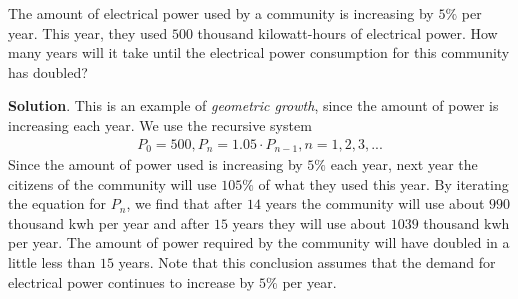 \documentclass[10pt,]{book}
\theoremstyle{ptxdefinitionnotitle}
\theoremstyle{ptxdefinitiontitle}
\theoremstyle{ptxdefinitionnotitle}
\theoremstyle{ptxdefinitiontitle}
\theoremstyle{ptxdefinitionnotitle}
\theoremstyle{ptxdefinitiontitle}
\numberwithin{equation}{section}
\begin{document}
\begin{example}\label{example-electrical-power-demand}
\hypertarget{p-73}{}%
The amount of electrical power used by a community is increasing by \(5\%\) per year.  This year, they used \(500\) thousand kilowatt-hours of electrical power.  How many years will it take until the electrical power consumption for this community has doubled?%
\par\smallskip%
\noindent\textbf{Solution}.\hypertarget{solution-5}{}\quad%
\hypertarget{p-74}{}%
This is an example of \emph{geometric growth}, since the amount of power is increasing each year. We use the recursive system%
%
\begin{gather*}
P_0=500, P_n=1.05 \cdot P_{n-1}, n=1,2,3,...
\end{gather*}
\hypertarget{p-75}{}%
Since the amount of power used is increasing by \(5\%\) each year, next year the citizens of the community will use \(105\%\) of what they used this year.  By iterating the equation for \(P_n\), we find that after \(14\) years the community will use about \(990\) thousand kwh per year and after \(15\) years they will use about \(1039\) thousand kwh per year.  The amount of power required by the community will have doubled in a little less than \(15\) years.  Note that this conclusion assumes that the demand for electrical power continues to increase by \(5\%\) per year.%
\end{example}
\end{document}
